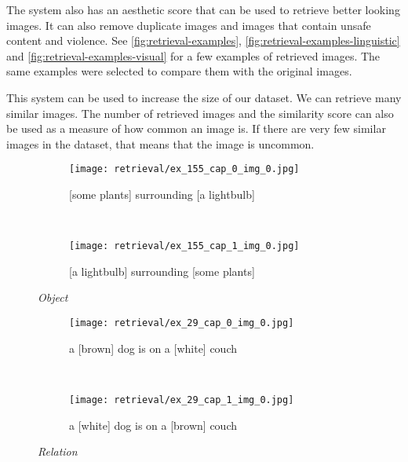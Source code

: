 The system also has an aesthetic score that can be used to retrieve better looking images. It can also remove duplicate images and images that contain unsafe content and violence. See \cref{fig:retrieval-examples}, \cref{fig:retrieval-examples-linguistic} and \cref{fig:retrieval-examples-visual} for a few examples of retrieved images. The same examples were selected to compare them with the original images.

This system can be used to increase the size of our dataset. We can retrieve many similar images. The number of retrieved images and the similarity score can also be used as a measure of how common an image is. If there are very few similar images in the dataset, that means that the image is uncommon.

\begin{figure}[ht]
\centering
    \begin{minipage}[t]{.30\textwidth}
        \begin{subfigure}[t]{\textwidth}
        \centering
        \texttt{[image: retrieval/ex\_155\_cap\_0\_img\_0.jpg]}
        \caption{[some plants] surrounding [a lightbulb]}
        \end{subfigure}\\
        \begin{subfigure}[t]{\textwidth}
        \centering
        \texttt{[image: retrieval/ex\_155\_cap\_1\_img\_0.jpg]}
        \caption{[a lightbulb] surrounding [some plants]}
        \end{subfigure}%
        \caption*{\textit{Object}}
    \end{minipage}
    \hfill
    \begin{minipage}[t]{.30\textwidth}
        \begin{subfigure}[t]{\textwidth}
        \centering
        \texttt{[image: retrieval/ex\_29\_cap\_0\_img\_0.jpg]}
        \caption{a [brown] dog is on a [white] couch}
        \end{subfigure}\\
        \vspace{9pt}
        \begin{subfigure}[t]{\textwidth}
        \centering
        \texttt{[image: retrieval/ex\_29\_cap\_1\_img\_0.jpg]}
        \caption{a [white] dog is on a [brown] couch}
        \end{subfigure}%
        \caption*{\textit{Relation}}
    \end{minipage}
    \hfill
    \begin{minipage}[t]{.30\textwidth}

\end{minipage}
\end{figure}
